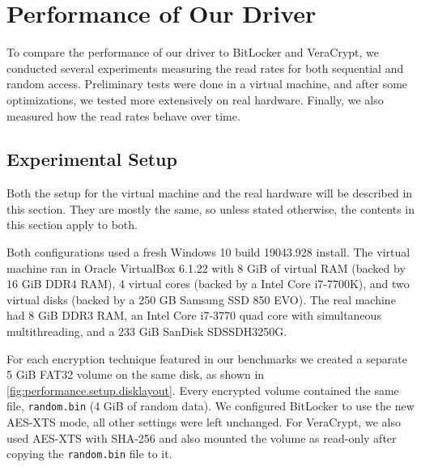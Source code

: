 \chapter{Performance of Our Driver}
\label{chap:performance}
To compare the performance of our driver to BitLocker and VeraCrypt, we conducted several experiments measuring the read rates for both sequential and random access. Preliminary tests were done in a virtual machine, and after some optimizations, we tested more extensively on real hardware. Finally, we also measured how the read rates behave over time.

\section{Experimental Setup}
\label{chap:performance.setup}
Both the setup for the virtual machine and the real hardware will be described in this section. They are mostly the same, so unless stated otherwise, the contents in this section apply to both.

Both configurations used a fresh Windows 10 build 19043.928 install. The virtual machine ran in Oracle VirtualBox 6.1.22 with 8 GiB of virtual RAM (backed by 16 GiB DDR4 RAM), 4 virtual cores (backed by a Intel Core i7-7700K), and two virtual disks (backed by a 250 GB Samsung SSD 850 EVO). The real machine had 8 GiB DDR3 RAM, an Intel Core i7-3770 quad core with simultaneous multithreading, and a 233 GiB SanDisk SDSSDH3250G.

For each encryption technique featured in our benchmarks we created a separate 5 GiB FAT32 volume on the same disk, as shown in \autoref{fig:performance.setup.disklayout}. Every encrypted volume contained the same file, \texttt{random.bin} (4 GiB of random data). We configured BitLocker to use the new AES-XTS mode, all other settings were left unchanged. For VeraCrypt, we also used AES-XTS with SHA-256 and also mounted the volume as read-only after copying the \texttt{random.bin} file to it.

